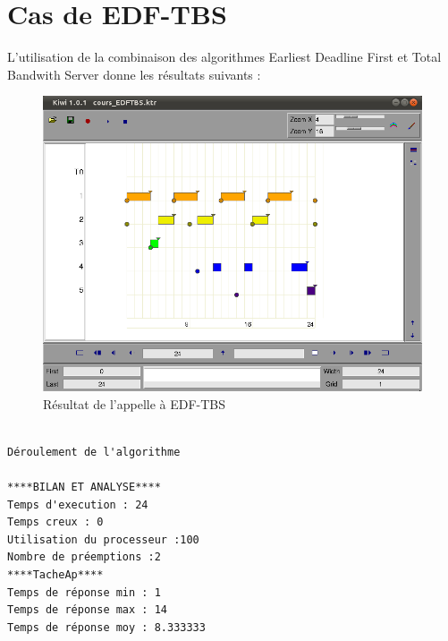 \section{Cas de EDF-TBS}
L'utilisation de la combinaison des algorithmes Earliest Deadline First et Total Bandwith Server donne les résultats suivants : 
\begin{figure}[htbp]
  \centering
  \includegraphics[scale=0.60]{img/EDF-TBS}
  \caption{Résultat de l'appelle à EDF-TBS}
  \label{fig:EDF-TBS}
\end{figure}

\begin{verbatim}

Déroulement de l'algorithme

****BILAN ET ANALYSE****
Temps d'execution : 24
Temps creux : 0
Utilisation du processeur :100
Nombre de préemptions :2
****TacheAp****
Temps de réponse min : 1
Temps de réponse max : 14
Temps de réponse moy : 8.333333
\end{verbatim}

